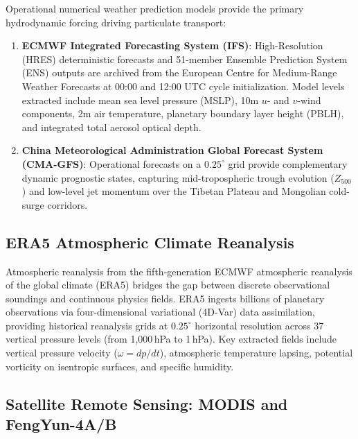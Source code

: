 Operational numerical weather prediction models provide the primary hydrodynamic forcing driving particulate transport:
\begin{enumerate}
    \item \textbf{ECMWF Integrated Forecasting System (IFS)}: High-Resolution (HRES) deterministic forecasts and 51-member Ensemble Prediction System (ENS) outputs are archived from the European Centre for Medium-Range Weather Forecasts at 00:00 and 12:00 UTC cycle initialization. Model levels extracted include mean sea level pressure (MSLP), 10m $u$- and $v$-wind components, 2m air temperature, planetary boundary layer height (PBLH), and integrated total aerosol optical depth.
    \item \textbf{China Meteorological Administration Global Forecast System (CMA-GFS)}: Operational forecasts on a $0.25^\circ$ grid provide complementary dynamic prognostic states, capturing mid-tropospheric trough evolution ($Z_{500}$) and low-level jet momentum over the Tibetan Plateau and Mongolian cold-surge corridors.
\end{enumerate}

\subsection{ERA5 Atmospheric Climate Reanalysis}
\label{subsec:era5_data}

Atmospheric reanalysis from the fifth-generation ECMWF atmospheric reanalysis of the global climate (ERA5) bridges the gap between discrete observational soundings and continuous physics fields. ERA5 ingests billions of planetary observations via four-dimensional variational (4D-Var) data assimilation, providing historical reanalysis grids at $0.25^\circ$ horizontal resolution across 37 vertical pressure levels (from 1{,}000\,hPa to 1\,hPa). Key extracted fields include vertical pressure velocity ($\omega = dp/dt$), atmospheric temperature lapsing, potential vorticity on isentropic surfaces, and specific humidity.

\subsection{Satellite Remote Sensing: MODIS and FengYun-4A/B}
\label{subsec:satellite_data}

